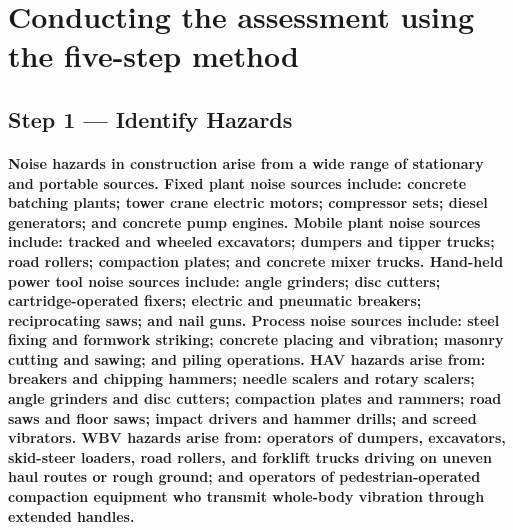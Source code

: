\begin{itemize}
\end{itemize}

\section{Conducting the assessment using the five-step method}

\subsection{Step 1 --- Identify Hazards}
\paragraph{Noise hazards in construction arise from a wide range of stationary and portable sources. Fixed plant noise sources include: concrete batching plants; tower crane electric motors; compressor sets; diesel generators; and concrete pump engines. Mobile plant noise sources include: tracked and wheeled excavators; dumpers and tipper trucks; road rollers; compaction plates; and concrete mixer trucks. Hand-held power tool noise sources include: angle grinders; disc cutters; cartridge-operated fixers; electric and pneumatic breakers; reciprocating saws; and nail guns. Process noise sources include: steel fixing and formwork striking; concrete placing and vibration; masonry cutting and sawing; and piling operations. HAV hazards arise from: breakers and chipping hammers; needle scalers and rotary scalers; angle grinders and disc cutters; compaction plates and rammers; road saws and floor saws; impact drivers and hammer drills; and screed vibrators. WBV hazards arise from: operators of dumpers, excavators, skid-steer loaders, road rollers, and forklift trucks driving on uneven haul routes or rough ground; and operators of pedestrian-operated compaction equipment who transmit whole-body vibration through extended handles.}

